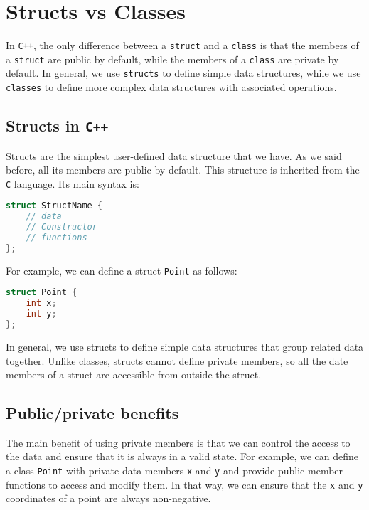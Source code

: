\section{Structs vs Classes}

In \texttt{C++}, the only difference between a \texttt{struct} and a \texttt{class}
is that the members of a \texttt{struct} are public by default, while the members
of a \texttt{class} are private by default. In general, we use \texttt{structs}
to define simple data structures, while we use \texttt{classes} to define more
complex data structures with associated operations.

\subsection{Structs in \texttt{C++}}

Structs are the simplest user-defined data structure that we have. As we said before, all its
members are public by default. This structure is inherited from the \texttt{C} language.
Its main syntax is:

\begin{lstlisting}[language=C++]
struct StructName {
    // data
    // Constructor
    // functions
};
\end{lstlisting}

For example, we can define a struct \texttt{Point} as follows:

\begin{lstlisting}[language=C++]
struct Point {
    int x;
    int y;
};
\end{lstlisting}

In general, we use structs to define simple data structures that group related
data together. Unlike classes, structs cannot define private members, so all
the date members of a struct are accessible from outside the struct.

\subsection{Public/private benefits}

The main benefit of using private members is that we can control the access to
the data and ensure that it is always in a valid state. For example, we can
define a class \texttt{Point} with private data members \texttt{x} and \texttt{y}
and provide public member functions to access and modify them. In that way, we
can ensure that the \texttt{x} and \texttt{y} coordinates of a point are always
non-negative.\\

